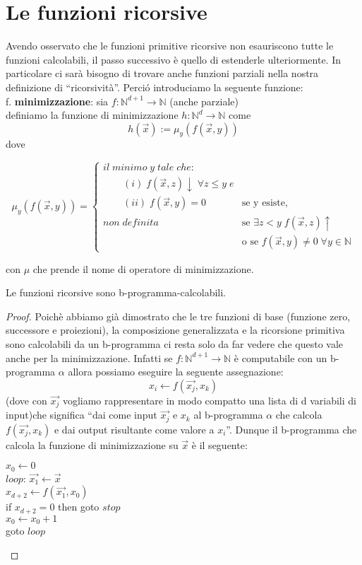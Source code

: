 \section{Le funzioni ricorsive}
Avendo osservato che le funzioni primitive ricorsive non
esauriscono tutte le funzioni calcolabili, il passo successivo \`e  quello di
estenderle ulteriormente. In particolare ci sar\`a bisogno di trovare
anche funzioni parziali nella nostra definizione di ``ricorsivit\`a''. Perci\'o
introduciamo
la seguente funzione: \\

f. \textbf{minimizzazione}: sia $f: \mathbb{N}^{d+1} \to \mathbb{N}$ (anche
parziale)\\
definiamo la funzione di minimizzazione $h: \mathbb{N}^{d} \to \mathbb{N}$ come
$$ h(\vec{x}):= \mu_{y}(f(\vec{x},y)) $$
dove

\[\mu_{y}(f(\vec{x},y)) = 
\begin{cases}
il \; minimo \; y \; tale \; che: \\
\qquad (i) \; f(\vec{x},z)\downarrow \; \forall z \leq y \; e \\
\qquad (ii) \; f(\vec{x},y)=0 & \text{se y esiste,} \\
non \; definita \; & \text{se $\exists z < y \; f(\vec{x},z) \uparrow$}\\
 & \text{o se $f(\vec{x},y)\neq 0 \; \forall y \in \mathbb{N} $}
\end{cases} \]

con $\mu$ che prende il nome di operatore di minimizzazione.
\begin{thm} Le funzioni ricorsive sono b-programma-calcolabili.
\end{thm}
\begin{proof} Poich\`e abbiamo gi\`a dimostrato che le tre funzioni di base
(funzione zero, successore e proiezioni), la composizione generalizzata e la
ricorsione primitiva sono calcolabili da un b-programma ci resta solo da far
vedere che questo vale anche per la minimizzazione. Infatti se
$f:\mathbb{N}^{d+1} \to \mathbb{N}$ \`e computabile con un b-programma $\alpha$
allora possiamo eseguire la seguente assegnazione:
$$x_i \leftarrow f(\vec{x_{j}}, x_k)$$
(dove con $\vec{x_{j}}$ vogliamo rappresentare in modo compatto una lista di d
variabili di input)che significa "`dai come input $\vec{x_{j}}$ e $x_k$ al
b-programma $\alpha$ che calcola $f(\vec{x_{j}}, x_k)$ e dai output risultante
come valore a $x_i$"'. Dunque il b-programma che calcola la funzione di
minimizzazione su $\vec{x}$ \`e il seguente:\\
   \begin{mylisting}
       $x_0 \leftarrow 0$ \\
       $loop$: $\vec{x_{1}} \leftarrow \vec{x}$\\
       $x_{d+2} \leftarrow f(\vec{x_{1}}, x_0)$\\
       if $x_{d+2} = 0$ then goto $stop$\\
       $x_0 \leftarrow x_0 + 1$\\
       goto $loop$
  \end{mylisting}
\end{proof}

